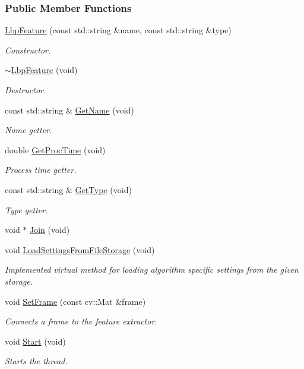 \subsubsection*{Public Member Functions}
\begin{DoxyCompactItemize}
\item 
\hyperlink{group___feature_extractor_a52b160f5fa16bc1ea0c489a744ed554f}{Lbp\-Feature} (const std\-::string \&name, const std\-::string \&type)
\begin{DoxyCompactList}\small\item\em Constructor. \end{DoxyCompactList}\item 
\hyperlink{group___feature_extractor_a40826a6cc5bc5f1de7edf8b05092052b}{$\sim$\-Lbp\-Feature} (void)
\begin{DoxyCompactList}\small\item\em Destructor. \end{DoxyCompactList}\item 
const std\-::string \& \hyperlink{group___feature_extractor_ab2ecc77360b2fa1400f29298a8e1b751}{Get\-Name} (void)
\begin{DoxyCompactList}\small\item\em Name getter. \end{DoxyCompactList}\item 
double \hyperlink{group___feature_extractor_a46f41fabf78e63d9e9c93cbaadf652a1}{Get\-Proc\-Time} (void)
\begin{DoxyCompactList}\small\item\em Process time getter. \end{DoxyCompactList}\item 
const std\-::string \& \hyperlink{group___feature_extractor_aba5fb3207f97ae73dc3cab7572baf85e}{Get\-Type} (void)
\begin{DoxyCompactList}\small\item\em Type getter. \end{DoxyCompactList}\item 
void $\ast$ \hyperlink{group___core_a8f33f7750321d5df9188033e7e3e300d}{Join} (void)
\item 
void \hyperlink{group___feature_extractor_a39ac99c8b8537ac9d104ae4368177071}{Load\-Settings\-From\-File\-Storage} (void)
\begin{DoxyCompactList}\small\item\em Implemented virtual method for loading algorithm specific settings from the given storage. \end{DoxyCompactList}\item 
void \hyperlink{group___feature_extractor_aee5c4e09e373308e7f50bfaffd8e2267}{Set\-Frame} (const cv\-::\-Mat \&frame)
\begin{DoxyCompactList}\small\item\em Connects a frame to the feature extractor. \end{DoxyCompactList}\item 
void \hyperlink{group___core_a2b42f82341afd2747ea093b6ac8b91cb}{Start} (void)
\begin{DoxyCompactList}\small\item\em Starts the thread. \end{DoxyCompactList}\end{DoxyCompactItemize}
